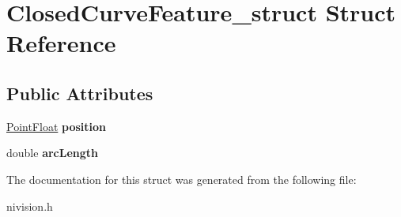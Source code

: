 \hypertarget{structClosedCurveFeature__struct}{
\section{ClosedCurveFeature\_\-struct Struct Reference}
\label{structClosedCurveFeature__struct}
}
\subsection*{Public Attributes}
\begin{DoxyCompactItemize}
\item 
\hypertarget{structClosedCurveFeature__struct_afbc1f807f0b4e584b7fcd6917869e441}{
\hyperlink{structPointFloat__struct}{PointFloat} {\bfseries position}}
\label{structClosedCurveFeature__struct_afbc1f807f0b4e584b7fcd6917869e441}

\item 
\hypertarget{structClosedCurveFeature__struct_a2508935b29c1acafb613b000d550abcb}{
double {\bfseries arcLength}}
\label{structClosedCurveFeature__struct_a2508935b29c1acafb613b000d550abcb}

\end{DoxyCompactItemize}


The documentation for this struct was generated from the following file:\begin{DoxyCompactItemize}
\item 
nivision.h\end{DoxyCompactItemize}
